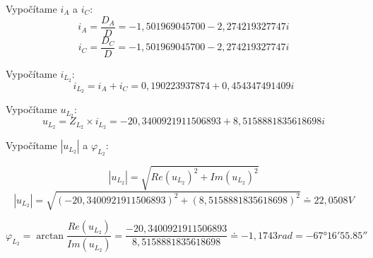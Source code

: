 {\Large Vypočítame $i_A$ a $i_C$:} 
{\large\[ i_A = \frac{D_A}{D} = -1,501969045700 - 2,274219327747i\]}
{\large\[ i_C = \frac{D_C}{D} = -1,501969045700 - 2,274219327747i\]}
\bigskip

{\Large Vypočítame $i_{L_2}$:} 
{\large\[ i_{L_2} = i_A + i_C = 0,190223937874 + 0,454347491409i\]}
\bigskip

{\Large Vypočítame $u_{L_2}$:} 
{\large\[ u_{L_2} = Z_{L_2} \times i_{L_2} = -20,3400921911506893 + 8,5158881835618698i\]}
\bigskip

{\Large Vypočítame $|u_{L_2}|$ a $\varphi_{L_2}$:} 

{\large\[ |u_{L_2}| = \sqrt{Re(u_{L_2})^2 + Im(u_{L_2})^2} \]}
{\large\[ |u_{L_2}| = \sqrt{(-20,3400921911506893)^2 + (8,5158881835618698)^2} \doteq 22,0508V \]}

{\large\[ \varphi_{L_2} = \arctan\frac{Re(u_{L_2})}{Im(u_{L_2})} = \frac{-20,3400921911506893}{8,5158881835618698} \doteq -1,1743rad =  \ang{-67;16;55.85}\]}